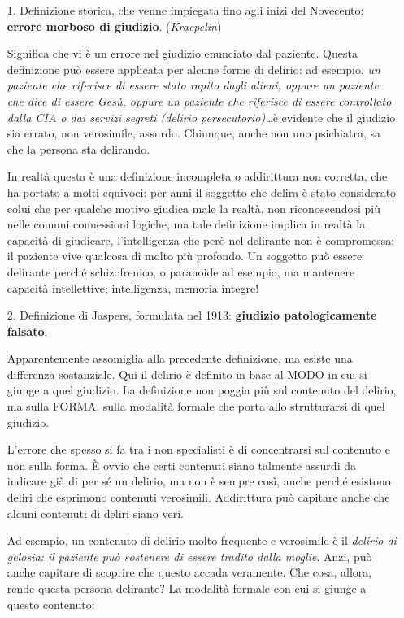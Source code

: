 \begin{itemize}
\item[1.]
  Definizione storica, che venne impiegata fino agli inizi del
  Novecento: \textbf{errore morboso di giudizio}. (\emph{Kraepelin})

Significa che vi è un errore nel giudizio enunciato dal paziente. Questa
definizione può essere applicata per alcune forme di delirio: ad
esempio, \emph{un paziente che riferisce di essere stato rapito dagli
alieni, oppure un paziente che dice di essere Gesù, oppure un paziente
che riferisce di essere controllato dalla CIA o dai servizi segreti
(delirio persecutorio)\ldots{}}è evidente che il giudizio sia errato,
non verosimile, assurdo. Chiunque, anche non uno psichiatra, sa che la
persona sta delirando.

In realtà questa è una definizione incompleta o addirittura non
corretta, che ha portato a molti equivoci: per anni il soggetto che
delira è stato considerato colui che per qualche motivo giudica male la
realtà, non riconoscendosi più nelle comuni connessioni logiche, ma tale
definizione implica in realtà la capacità di giudicare, l'intelligenza
che però nel delirante non è compromessa: il paziente vive qualcosa di
molto più profondo. Un soggetto può essere delirante perché
schizofrenico, o paranoide ad esempio, ma mantenere capacità
intellettive; intelligenza, memoria integre!

\item[2.]
  Definizione di Jaspers, formulata nel 1913: \textbf{giudizio
  patologicamente falsato}.

Apparentemente assomiglia alla precedente definizione, ma esiste una
differenza sostanziale. Qui il delirio è definito in base al MODO in cui
si giunge a quel giudizio. La definizione non poggia più sul contenuto
del delirio, ma sulla FORMA, sulla modalità formale che porta allo
strutturarsi di quel giudizio.

L'errore che spesso si fa tra i non specialisti è di concentrarsi sul
contenuto e non sulla forma. È ovvio che certi contenuti siano talmente
assurdi da indicare già di per sé un delirio, ma non è sempre così,
anche perché esistono deliri che esprimono contenuti verosimili.
Addirittura può capitare anche che alcuni contenuti di deliri siano
veri.

Ad esempio, un contenuto di delirio molto frequente e verosimile è il
\emph{delirio di gelosia: il paziente può sostenere di essere tradito
dalla moglie}. Anzi, può anche capitare di scoprire che questo accada
veramente. Che cosa, allora, rende questa persona delirante? La modalità
formale con cui si giunge a questo contenuto:


\end{itemize}

